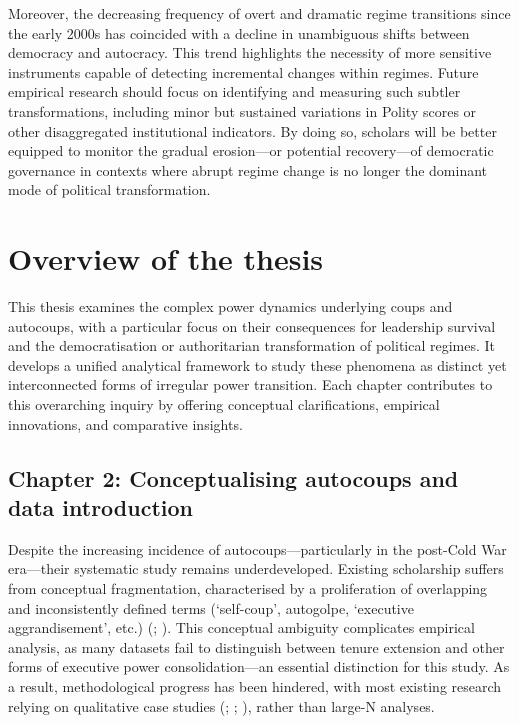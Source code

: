 \documentclass[
  12pt,
]{report}
\begin{document}
Moreover, the decreasing frequency of overt and dramatic regime
transitions since the early 2000s has coincided with a decline in
unambiguous shifts between democracy and autocracy. This trend
highlights the necessity of more sensitive instruments capable of
detecting incremental changes within regimes. Future empirical research
should focus on identifying and measuring such subtler transformations,
including minor but sustained variations in Polity scores or other
disaggregated institutional indicators. By doing so, scholars will be
better equipped to monitor the gradual erosion---or potential
recovery---of democratic governance in contexts where abrupt regime
change is no longer the dominant mode of political transformation.

\section{Overview of the thesis}\label{overview-of-the-thesis}

This thesis examines the complex power dynamics underlying coups and
autocoups, with a particular focus on their consequences for leadership
survival and the democratisation or authoritarian transformation of
political regimes. It develops a unified analytical framework to study
these phenomena as distinct yet interconnected forms of irregular power
transition. Each chapter contributes to this overarching inquiry by
offering conceptual clarifications, empirical innovations, and
comparative insights.

\subsection*{Chapter 2: Conceptualising autocoups and data
introduction}\label{chapter-2-conceptualising-autocoups-and-data-introduction}

Despite the increasing incidence of autocoups---particularly in the
post-Cold War era---their systematic study remains underdeveloped.
Existing scholarship suffers from conceptual fragmentation,
characterised by a proliferation of overlapping and inconsistently
defined terms (`self-coup', autogolpe, `executive aggrandisement', etc.)
(;
). This conceptual
ambiguity complicates empirical analysis, as many datasets fail to
distinguish between tenure extension and other forms of executive power
consolidation---an essential distinction for this study. As a result,
methodological progress has been hindered, with most existing research
relying on qualitative case studies (; ;
),
rather than large-N analyses.
\end{document}
